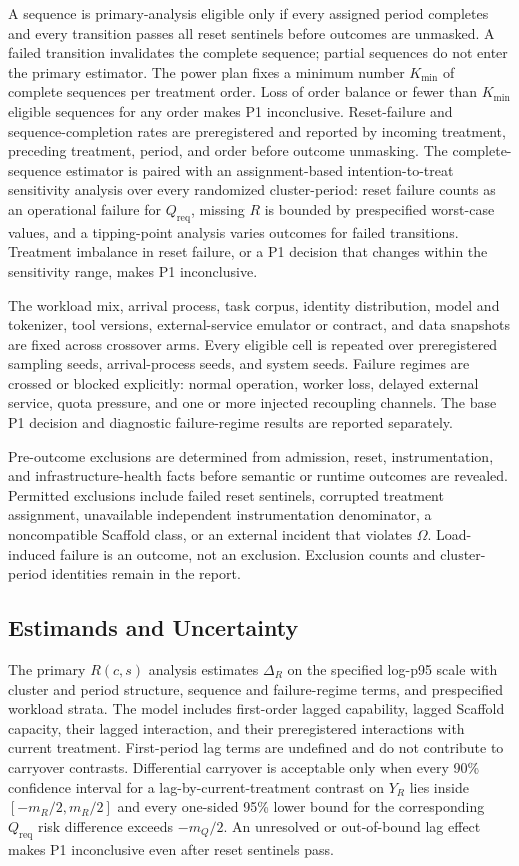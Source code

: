 \documentclass[11pt]{article}
\begin{document}
A sequence is primary-analysis eligible only if every assigned period completes and every transition passes all reset sentinels before outcomes are unmasked. A failed transition invalidates the complete sequence; partial sequences do not enter the primary estimator. The power plan fixes a minimum number $K_{\min}$ of complete sequences per treatment order. Loss of order balance or fewer than $K_{\min}$ eligible sequences for any order makes P1 inconclusive. Reset-failure and sequence-completion rates are preregistered and reported by incoming treatment, preceding treatment, period, and order before outcome unmasking. The complete-sequence estimator is paired with an assignment-based intention-to-treat sensitivity analysis over every randomized cluster-period: reset failure counts as an operational failure for $Q_{\mathrm{req}}$, missing $R$ is bounded by prespecified worst-case values, and a tipping-point analysis varies outcomes for failed transitions. Treatment imbalance in reset failure, or a P1 decision that changes within the sensitivity range, makes P1 inconclusive.

The workload mix, arrival process, task corpus, identity distribution, model and tokenizer, tool versions, external-service emulator or contract, and data snapshots are fixed across crossover arms. Every eligible cell is repeated over preregistered sampling seeds, arrival-process seeds, and system seeds. Failure regimes are crossed or blocked explicitly: normal operation, worker loss, delayed external service, quota pressure, and one or more injected recoupling channels. The base P1 decision and diagnostic failure-regime results are reported separately.

Pre-outcome exclusions are determined from admission, reset, instrumentation, and infrastructure-health facts before semantic or runtime outcomes are revealed. Permitted exclusions include failed reset sentinels, corrupted treatment assignment, unavailable independent instrumentation denominator, a noncompatible Scaffold class, or an external incident that violates $\Omega$. Load-induced failure is an outcome, not an exclusion. Exclusion counts and cluster-period identities remain in the report.

\subsection{Estimands and Uncertainty}

The primary $R(c,s)$ analysis estimates $\Delta_R$ on the specified log-p95 scale with cluster and period structure, sequence and failure-regime terms, and prespecified workload strata. The model includes first-order lagged capability, lagged Scaffold capacity, their lagged interaction, and their preregistered interactions with current treatment. First-period lag terms are undefined and do not contribute to carryover contrasts. Differential carryover is acceptable only when every 90\% confidence interval for a lag-by-current-treatment contrast on $Y_R$ lies inside $[-m_R/2,m_R/2]$ and every one-sided 95\% lower bound for the corresponding $Q_{\mathrm{req}}$ risk difference exceeds $-m_Q/2$. An unresolved or out-of-bound lag effect makes P1 inconclusive even after reset sentinels pass.
\end{document}
